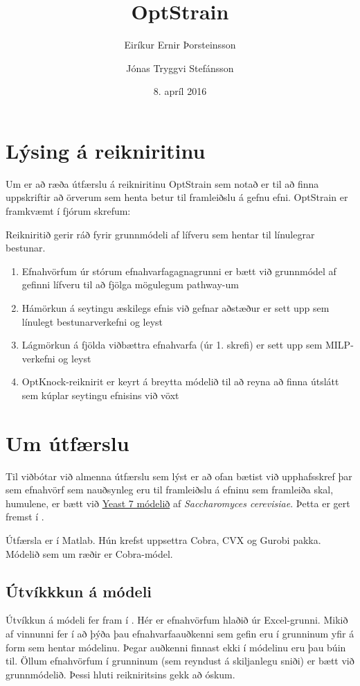 \documentclass[11pt]{article}
\title{OptStrain}
\author{Eiríkur Ernir Þorsteinsson \and Jónas Tryggvi Stefánsson}
\date{8. apríl 2016}
\begin{document}
\maketitle

\section{Lýsing á reikniritinu}

Um er að ræða útfærslu á reikniritinu OptStrain\cite{pharkya2004optstrain} sem notað er til að finna uppskriftir að örverum sem henta betur til framleiðslu á gefnu efni. OptStrain er framkvæmt í fjórum skrefum:

Reikniritið gerir ráð fyrir grunnmódeli af lífveru sem hentar til línulegrar bestunar.
\begin{enumerate}
 \item Efnahvörfum úr stórum efnahvarfagagnagrunni er bætt við grunnmódel af gefinni lífveru til að fjölga mögulegum pathway-um
 \item Hámörkun á seytingu æskilegs efnis við gefnar aðstæður er sett upp sem línulegt bestunarverkefni og leyst
 \item Lágmörkun á fjölda viðbættra efnahvarfa (úr 1. skrefi) er sett upp sem MILP-verkefni og leyst
 \item OptKnock-reiknirit\cite{burgard2003optknock} er keyrt á breytta módelið til að reyna að finna útslátt sem kúplar seytingu efnisins við vöxt
\end{enumerate}

\section{Um útfærslu}
Til viðbótar við almenna útfærslu sem lýst er að ofan bætist við upphafsskref þar sem efnahvörf sem nauðsynleg eru til framleiðslu á efninu sem framleiða skal, humulene, er bætt við \href{http://yeast.sourceforge.net/}{Yeast 7 módelið} af \emph{Saccharomyces cerevisiae}. Þetta er gert fremst í .

Útfærsla er í Matlab. Hún krefst uppsettra Cobra, CVX og Gurobi pakka. Módelið sem um ræðir er Cobra-módel.
\subsection{Útvíkkkun á módeli}
Útvíkkun á módeli fer fram í . Hér er efnahvörfum hlaðið úr Excel-grunni. Mikið af vinnunni fer í að þýða þau efnahvarfaauðkenni sem gefin eru í grunninum yfir á form sem hentar módelinu. Þegar auðkenni finnast ekki í módelinu eru þau búin til. Öllum efnahvörfum í grunninum (sem reyndust á skiljanlegu sniði) er bætt við grunnmódelið. Þessi hluti reikniritsins gekk að óskum.
\end{document}

